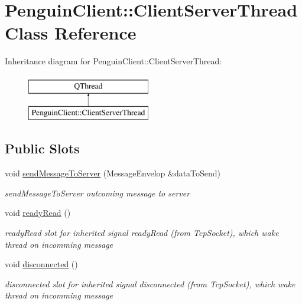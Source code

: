 \hypertarget{classPenguinClient_1_1ClientServerThread}{\section{Penguin\-Client\-:\-:Client\-Server\-Thread Class Reference}
\label{classPenguinClient_1_1ClientServerThread}
}
Inheritance diagram for Penguin\-Client\-:\-:Client\-Server\-Thread\-:\begin{figure}[H]
\begin{center}
\leavevmode
\includegraphics[height=2.000000cm]{classPenguinClient_1_1ClientServerThread}
\end{center}
\end{figure}
\subsection*{Public Slots}
\begin{DoxyCompactItemize}
\item 
void \hyperlink{classPenguinClient_1_1ClientServerThread_ac900a0f88575edac07b986919252124a}{send\-Message\-To\-Server} (Message\-Envelop \&data\-To\-Send)
\begin{DoxyCompactList}\small\item\em send\-Message\-To\-Server outcoming message to server \end{DoxyCompactList}\item 
\hypertarget{classPenguinClient_1_1ClientServerThread_adcb5c4f0a262e466c7112b6936bf1afa}{void \hyperlink{classPenguinClient_1_1ClientServerThread_adcb5c4f0a262e466c7112b6936bf1afa}{ready\-Read} ()}\label{classPenguinClient_1_1ClientServerThread_adcb5c4f0a262e466c7112b6936bf1afa}

\begin{DoxyCompactList}\small\item\em ready\-Read slot for inherited signal ready\-Read (from Tcp\-Socket), which wake thread on incomming message \end{DoxyCompactList}\item 
\hypertarget{classPenguinClient_1_1ClientServerThread_aa7ec5ef2fe7b46a75f6e36981ed0853f}{void \hyperlink{classPenguinClient_1_1ClientServerThread_aa7ec5ef2fe7b46a75f6e36981ed0853f}{disconnected} ()}\label{classPenguinClient_1_1ClientServerThread_aa7ec5ef2fe7b46a75f6e36981ed0853f}

\begin{DoxyCompactList}\small\item\em disconnected slot for inherited signal disconnected (from Tcp\-Socket), which wake thread on incomming message \end{DoxyCompactList}\end{DoxyCompactItemize}
